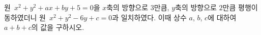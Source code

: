 원~$x^2+y^2+ax+by+5=0$을 $x$축의 방향으로 $3$만큼, $y$축의 방향으로 $2$만큼 평행이동하였더니 원~$x^2+y^2-6y+c=0$과 일치하였다. 이때 상수 $a$, $b$, $c$에 대하여 $a+b+c$의 값을 구하시오.
